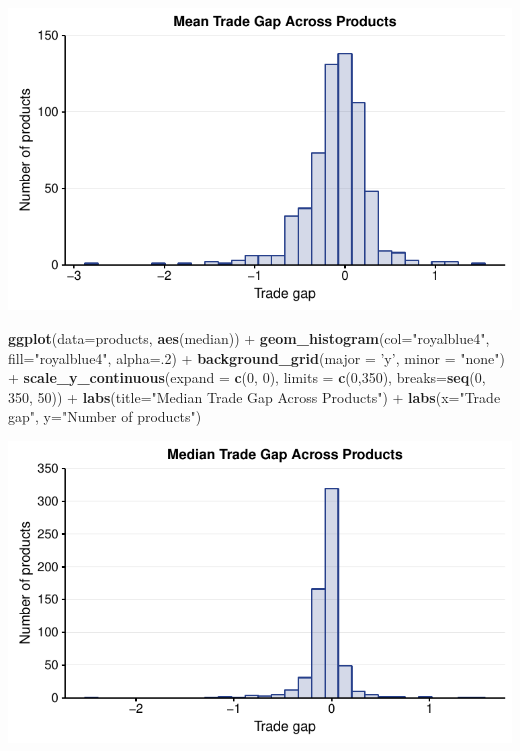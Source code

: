 \documentclass[10pt,]{article}
\newenvironment{Shaded}{\begin{snugshade}}{\end{snugshade}}
\newcommand{\KeywordTok}[1]{\textcolor[rgb]{0.13,0.29,0.53}{\textbf{{#1}}}}
\newcommand{\DataTypeTok}[1]{\textcolor[rgb]{0.13,0.29,0.53}{{#1}}}
\newcommand{\DecValTok}[1]{\textcolor[rgb]{0.00,0.00,0.81}{{#1}}}
\newcommand{\StringTok}[1]{\textcolor[rgb]{0.31,0.60,0.02}{{#1}}}
\newcommand{\NormalTok}[1]{{#1}}
\begin{document}
\begin{center}\includegraphics{Figs/value_products-1} \end{center}

\begin{Shaded}
\begin{Highlighting}[]
\KeywordTok{ggplot}\NormalTok{(}\DataTypeTok{data=}\NormalTok{products, }\KeywordTok{aes}\NormalTok{(median)) +}
\StringTok{  }\KeywordTok{geom_histogram}\NormalTok{(}\DataTypeTok{col=}\StringTok{"royalblue4"}\NormalTok{,}
                 \DataTypeTok{fill=}\StringTok{"royalblue4"}\NormalTok{,}
                 \DataTypeTok{alpha=}\NormalTok{.}\DecValTok{2}\NormalTok{) +}
\StringTok{  }\KeywordTok{background_grid}\NormalTok{(}\DataTypeTok{major =} \StringTok{'y'}\NormalTok{, }\DataTypeTok{minor =} \StringTok{"none"}\NormalTok{) +}
\StringTok{  }\KeywordTok{scale_y_continuous}\NormalTok{(}\DataTypeTok{expand =} \KeywordTok{c}\NormalTok{(}\DecValTok{0}\NormalTok{, }\DecValTok{0}\NormalTok{), }\DataTypeTok{limits =} \KeywordTok{c}\NormalTok{(}\DecValTok{0}\NormalTok{,}\DecValTok{350}\NormalTok{),  }\DataTypeTok{breaks=}\KeywordTok{seq}\NormalTok{(}\DecValTok{0}\NormalTok{, }\DecValTok{350}\NormalTok{, }\DecValTok{50}\NormalTok{)) +}
\StringTok{  }\KeywordTok{labs}\NormalTok{(}\DataTypeTok{title=}\StringTok{"Median Trade Gap Across Products"}\NormalTok{) +}
\StringTok{  }\KeywordTok{labs}\NormalTok{(}\DataTypeTok{x=}\StringTok{"Trade gap"}\NormalTok{, }\DataTypeTok{y=}\StringTok{"Number of products"}\NormalTok{)}
\end{Highlighting}
\end{Shaded}

\begin{center}\includegraphics{Figs/value_products-2} \end{center}
\end{document}
